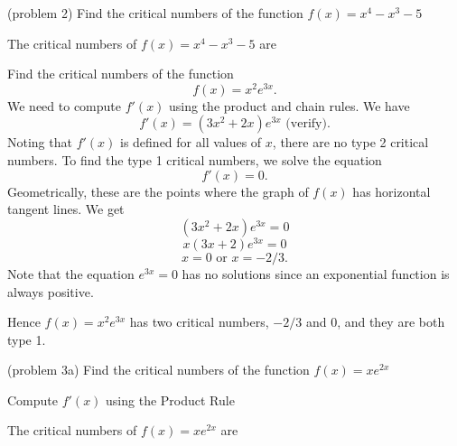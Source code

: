 \documentclass[handout]{ximera}
\begin{document}
\begin{problem}(problem 2)
  Find the critical numbers of the function $f(x) = x^4 - x^3 - 5$
    
		The critical numbers of $f(x) = x^4 - x^3 - 5$ are
		\begin{multipleChoice}
		\end{multipleChoice} 
		
\end{problem}




\begin{example}[example 3] Find the critical numbers of the function 
\[f(x) = x^2e^{3x}.\]
We need to compute $f'(x)$ using the product and chain rules.  We have
\[f'(x) = (3x^2 +2x)e^{3x} \mbox{   (verify)}.\]
Noting that $f'(x)$ is defined for all values of $x$, there are no type 2 critical numbers.
To find the type 1 critical numbers, we solve the equation
\[f'(x) = 0.\]
Geometrically, these are the points where the graph of $f(x)$ has horizontal tangent lines.
We get
\[ (3x^2 +2x)e^{3x} =0\]
\[ x(3x+2)e^{3x} =0\]
\[x = 0 \mbox{   or   }  x = -2/3.\]
Note that the equation $e^{3x} = 0$ has no solutions since an exponential function is always positive.

Hence $f(x) = x^2e^{3x}$ has two critical numbers, $-2/3$ and $0$, and they are both type 1. 

\begin{image}
\end{image}

\end{example}

\begin{problem}(problem 3a)
  Find the critical numbers of the function $f(x) = xe^{2x}$
  
  
    \begin{hint}
      Compute $f'(x)$ using the Product Rule
    \end{hint}    
    
		The critical numbers of $f(x) = xe^{2x}$ are
		\begin{multipleChoice}
		\choice[correct]{$x = -1/2$}
		\choice{$x = 0$ and $x = -1/2$}
		\choice{no critical numbers}
		\end{multipleChoice} 
		
\end{problem}
\end{document}
